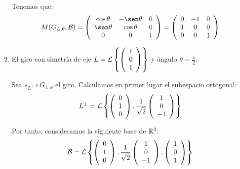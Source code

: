 \begin{ejercicio}
\begin{enumerate}
        Tenemos que:
        \begin{equation*}
            M(G_{L,\theta},\cc{B})=\left(\begin{array}{ccc}
                \cos \theta & -\sen \theta & 0 \\
                \sen \theta & \cos \theta & 0\\
                0& 0& 1
            \end{array}\right)
            = \left(\begin{array}{ccc}
                0 & -1 & 0 \\
                1 & 0 & 0\\
                0& 0& 1
            \end{array}\right)
        \end{equation*}
        
        \item El giro con simetría de eje $L=\mathcal{L}\left\{\left(\begin{array}{c}
                     1 \\ 0 \\ 1
                \end{array}\right)\right\}$ y ángulo $\displaystyle \theta=\frac{\pi}{2}$.

        Sea $s_{L^\perp}\circ G_{L,\theta}$ el giro. Calculamos en primer lugar el subespacio ortogonal:
        \begin{equation*}
            L^\perp = \mathcal{L}\left\{
            \left(\begin{array}{c}
                 0 \\ 1 \\ 0
            \end{array}\right),
            \frac{1}{\sqrt{2}}
            \left(\begin{array}{c}
                 1 \\ 0 \\ -1
            \end{array}\right)
            \right\}
        \end{equation*}

        Por tanto, consideramos la siguiente base de $\mathbb{R}^3$:
        \begin{equation*}
            \mathcal{B} = \mathcal{L}\left\{
            \left(\begin{array}{c}
                 0 \\ 1 \\ 0
            \end{array}\right),
            \frac{1}{\sqrt{2}}
            \left(\begin{array}{c}
                 1 \\ 0 \\ -1
            \end{array}\right),
            \left(\begin{array}{c}
                 1 \\ 0 \\ 1
            \end{array}\right)
            \right\}
        \end{equation*}


\end{enumerate}
\end{ejercicio}
